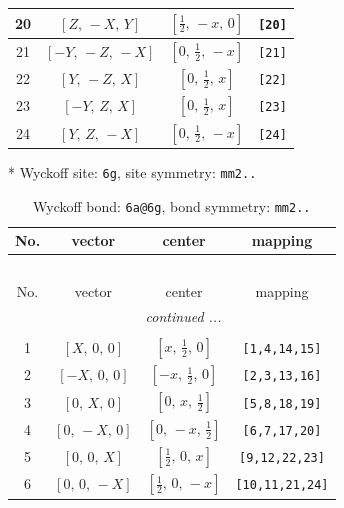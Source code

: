 \documentclass[fleqn,8pt]{jsarticle}
\begin{document}
\begin{longtable}{cccc}
20 & $\left[ Z,\, - X,\, Y \right]$ & $\left[ \frac{1}{2},\, - x,\, 0 \right]$ & {\tt [20]} \\ \hline
21 & $\left[ - Y,\, - Z,\, - X \right]$ & $\left[ 0,\, \frac{1}{2},\, - x \right]$ & {\tt [21]} \\ \hline
22 & $\left[ Y,\, - Z,\, X \right]$ & $\left[ 0,\, \frac{1}{2},\, x \right]$ & {\tt [22]} \\ \hline
23 & $\left[ - Y,\, Z,\, X \right]$ & $\left[ 0,\, \frac{1}{2},\, x \right]$ & {\tt [23]} \\ \hline
24 & $\left[ Y,\, Z,\, - X \right]$ & $\left[ 0,\, \frac{1}{2},\, - x \right]$ & {\tt [24]} \\
\end{longtable}
* Wyckoff site: {\tt 6g}, site symmetry: {\tt mm2..}
\renewcommand{\arraystretch}{1.2}
\begin{longtable}{cccc}
\caption{Wyckoff bond: {\tt 6a@6g}, bond symmetry: {\tt mm2..}}
 \\
 \hline \hline
No. & vector & center & mapping \\ \hline \endfirsthead

\multicolumn{3}{l}{\tablename\ \thetable{}} \\
 \hline \hline
No. & vector & center & mapping \\ \hline \endhead

 \hline \hline
\multicolumn{3}{r}{\footnotesize\it continued ...} \\ \endfoot

 \hline \hline
\multicolumn{3}{r}{} \\ \endlastfoot

1 & $\left[ X,\, 0,\, 0 \right]$ & $\left[ x,\, \frac{1}{2},\, 0 \right]$ & {\tt [1,4,14,15]} \\ \hline
2 & $\left[ - X,\, 0,\, 0 \right]$ & $\left[ - x,\, \frac{1}{2},\, 0 \right]$ & {\tt [2,3,13,16]} \\ \hline
3 & $\left[ 0,\, X,\, 0 \right]$ & $\left[ 0,\, x,\, \frac{1}{2} \right]$ & {\tt [5,8,18,19]} \\ \hline
4 & $\left[ 0,\, - X,\, 0 \right]$ & $\left[ 0,\, - x,\, \frac{1}{2} \right]$ & {\tt [6,7,17,20]} \\ \hline
5 & $\left[ 0,\, 0,\, X \right]$ & $\left[ \frac{1}{2},\, 0,\, x \right]$ & {\tt [9,12,22,23]} \\ \hline
6 & $\left[ 0,\, 0,\, - X \right]$ & $\left[ \frac{1}{2},\, 0,\, - x \right]$ & {\tt [10,11,21,24]} \\
\end{longtable}
\end{document}
